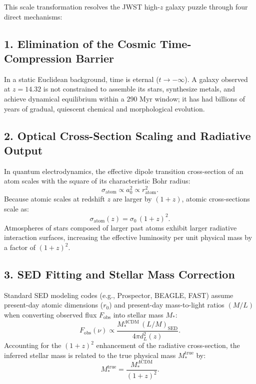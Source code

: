\documentclass[11pt,a4paper]{article}
\begin{document}
This scale transformation resolves the JWST high-$z$ galaxy puzzle through four direct mechanisms:

\subsection{1. Elimination of the Cosmic Time-Compression Barrier}
In a static Euclidean background, time is eternal ($t \to -\infty$). A galaxy observed at $z = 14.32$ is not constrained to assemble its stars, synthesize metals, and achieve dynamical equilibrium within a $290\text{ Myr}$ window; it has had billions of years of gradual, quiescent chemical and morphological evolution.

\subsection{2. Optical Cross-Section Scaling and Radiative Output}
In quantum electrodynamics, the effective dipole transition cross-section of an atom scales with the square of its characteristic Bohr radius:
\begin{equation}
    \sigma_{\mathrm{atom}} \propto a_0^2 \propto r_{\mathrm{atom}}^2.
\end{equation}
Because atomic scales at redshift $z$ are larger by $(1+z)$, atomic cross-sections scale as:
\begin{equation}
    \sigma_{\mathrm{atom}}(z) = \sigma_0 \, (1+z)^2.
\end{equation}
Atmospheres of stars composed of larger past atoms exhibit larger radiative interaction surfaces, increasing the effective luminosity per unit physical mass by a factor of $(1+z)^2$.

\subsection{3. SED Fitting and Stellar Mass Correction}
Standard SED modeling codes (e.g., Prospector, BEAGLE, FAST) assume present-day atomic dimensions ($r_0$) and present-day mass-to-light ratios $(M/L)$ when converting observed flux $F_{\mathrm{obs}}$ into stellar mass $M_*$:
\begin{equation}
    F_{\mathrm{obs}}(\nu) \propto \frac{M_*^{\Lambda\mathrm{CDM}} \, (L/M)_{\mathrm{SED}}}{4\pi d_L^2(z)}.
\end{equation}
Accounting for the $(1+z)^2$ enhancement of the radiative cross-section, the inferred stellar mass is related to the true physical mass $M_*^{\mathrm{true}}$ by:
\begin{equation}
    \boxed{ M_*^{\mathrm{true}} = \frac{M_*^{\Lambda\mathrm{CDM}}}{(1+z)^2}. }
    \label{eq:mass_correction}
\end{equation}
\end{document}
